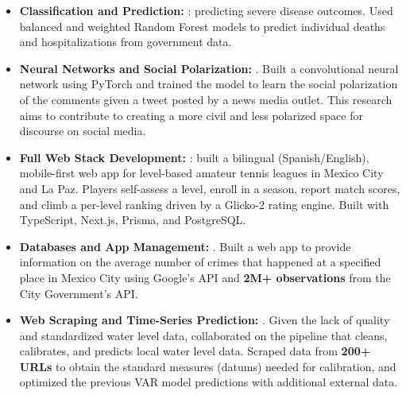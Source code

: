 \documentclass[10pt,letterpaper]{article}
\begin{document}
\begin{itemize}
  \item \textbf{Classification and Prediction:} : predicting severe disease outcomes. Used balanced and weighted Random Forest models to predict individual deaths and hospitalizations from government data.
  \item \textbf{Neural Networks and Social Polarization:} . Built a convolutional neural network using PyTorch and trained the model to learn the social polarization of the comments given a tweet posted by a news media outlet. This research aims to contribute to creating a more civil and less polarized space for discourse on social media.
  \item \textbf{Full Web Stack Development:} : built a bilingual (Spanish/English), mobile-first web app for level-based amateur tennis leagues in Mexico City and La Paz. Players self-assess a level, enroll in a season, report match scores, and climb a per-level ranking driven by a Glicko-2 rating engine. Built with TypeScript, Next.js, Prisma, and PostgreSQL.
  \item \textbf{Databases and App Management:} . Built a web app to provide information on the average number of crimes that happened at a specified place in Mexico City using Google's API and \textbf{2M+ observations} from the City Government's API.
  \item \textbf{Web Scraping and Time-Series Prediction:} . Given the lack of quality and standardized water level data, collaborated on the pipeline that cleans, calibrates, and predicts local water level data. Scraped data from \textbf{200+ URLs} to obtain the standard measures (datums) needed for calibration, and optimized the previous VAR model predictions with additional external data.
\end{itemize}
\end{document}
